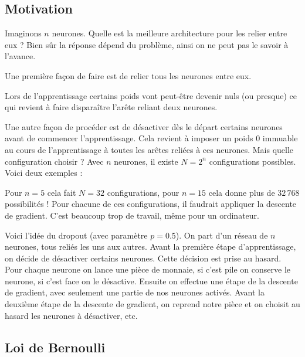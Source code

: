 \documentclass[11pt,class=report,crop=false]{standalone}
\begin{document}

\subsection{Motivation}

Imaginons $n$ neurones. Quelle est la meilleure architecture pour les relier entre eux ?
Bien sûr la réponse dépend du problème, ainsi on ne peut pas le savoir à l'avance. 

Une première façon de faire est de relier tous les neurones entre eux.



Lors de l'apprentissage certains poids vont peut-être devenir nuls (ou presque) ce qui revient à faire disparaître l'arête reliant deux neurones.



Une autre façon de procéder est de désactiver dès le départ certains neurones avant de commencer l'apprentissage. Cela revient à imposer un poids $0$ immuable au cours de l'apprentissage à toutes les arêtes reliées à ces neurones.
Mais quelle configuration choisir ? Avec $n$ neurones, il existe $N = 2^n$ configurations possibles. Voici deux exemples :


Pour $n=5$ cela fait $N=32$ configurations, pour $n=15$ cela donne plus de $32\,768$ possibilités ! Pour chacune de ces configurations, il faudrait appliquer la descente de gradient. C'est beaucoup trop de travail, même pour un ordinateur.

Voici l'idée du dropout (avec paramètre $p=0.5$).
On part d'un réseau de $n$ neurones, tous reliés les uns aux autres.
Avant la première étape d'apprentissage, on décide de désactiver certains neurones.
Cette décision est prise au hasard. Pour chaque neurone on lance une pièce de monnaie, si c'est \og{}pile\fg{} on conserve le neurone, si c'est \og{}face\fg{} on le désactive. Ensuite on effectue une étape de la descente de gradient, avec seulement une partie de nos neurones activés. Avant la deuxième étape de la descente de gradient, on reprend notre pièce et on choisit au hasard les neurones à désactiver, etc.


\subsection{Loi de Bernoulli}
\end{document}
